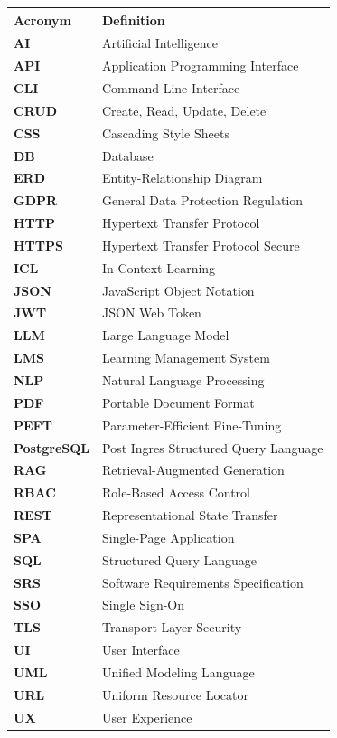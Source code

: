 \documentclass[12pt, a4paper, oneside]{report}
\begin{document}
\begin{tabular}{>{\bfseries}p{3.5cm} p{11cm}}
\toprule
Acronym & Definition \\
\midrule
AI    & Artificial Intelligence \\
API   & Application Programming Interface \\
CLI   & Command-Line Interface \\
CRUD  & Create, Read, Update, Delete \\
CSS   & Cascading Style Sheets \\
DB    & Database \\
ERD   & Entity-Relationship Diagram \\
GDPR  & General Data Protection Regulation \\
HTTP  & Hypertext Transfer Protocol \\
HTTPS & Hypertext Transfer Protocol Secure \\
ICL   & In-Context Learning \\
JSON  & JavaScript Object Notation \\
JWT   & JSON Web Token \\
LLM   & Large Language Model \\
LMS   & Learning Management System \\
NLP   & Natural Language Processing \\
PDF   & Portable Document Format \\
PEFT  & Parameter-Efficient Fine-Tuning \\
PostgreSQL & Post Ingres Structured Query Language \\
RAG   & Retrieval-Augmented Generation \\
RBAC  & Role-Based Access Control \\
REST  & Representational State Transfer \\
SPA   & Single-Page Application \\
SQL   & Structured Query Language \\
SRS   & Software Requirements Specification \\
SSO   & Single Sign-On \\
TLS   & Transport Layer Security \\
UI    & User Interface \\
UML   & Unified Modeling Language \\
URL   & Uniform Resource Locator \\
UX    & User Experience \\
\bottomrule
\end{tabular}
\end{document}
